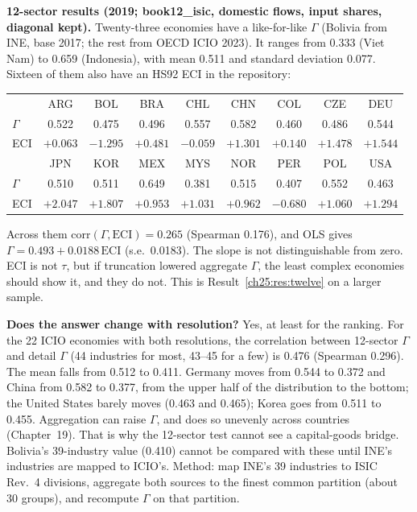 \documentclass[../solutions_manual.tex]{subfiles}
\begin{document}
 \textbf{12-sector results (2019; book12\_isic, domestic flows, input shares, diagonal kept).} Twenty-three economies have a like-for-like $\Gamma$ (Bolivia from INE, base 2017; the rest from OECD ICIO 2023). It ranges from 0.333 (Viet Nam) to 0.659 (Indonesia), with mean 0.511 and standard deviation 0.077. Sixteen of them also have an HS92 ECI in the repository:
\begin{center}
\small
\begin{tabular}{lcccccccc}
\toprule
& ARG & BOL & BRA & CHL & CHN & COL & CZE & DEU \\
$\Gamma$ & 0.522 & 0.475 & 0.496 & 0.557 & 0.582 & 0.460 & 0.486 & 0.544 \\
ECI & $+0.063$ & $-1.295$ & $+0.481$ & $-0.059$ & $+1.301$ & $+0.140$ & $+1.478$ & $+1.544$ \\
\midrule
& JPN & KOR & MEX & MYS & NOR & PER & POL & USA \\
$\Gamma$ & 0.510 & 0.511 & 0.649 & 0.381 & 0.515 & 0.407 & 0.552 & 0.463 \\
ECI & $+2.047$ & $+1.807$ & $+0.953$ & $+1.031$ & $+0.962$ & $-0.680$ & $+1.060$ & $+1.294$ \\
\bottomrule
\end{tabular}
\end{center}
Across them $\text{corr}(\Gamma, \text{ECI}) = 0.265$ (Spearman 0.176), and OLS gives $\Gamma = 0.493 + 0.0188\,\text{ECI}$ (s.e.\ 0.0183). The slope is not distinguishable from zero. ECI is not $\tau$, but if truncation lowered aggregate $\Gamma$, the least complex economies should show it, and they do not. This is Result~\ref{ch25:res:twelve} on a larger sample.

 \textbf{Does the answer change with resolution?} Yes, at least for the ranking. For the 22 ICIO economies with both resolutions, the correlation between 12-sector $\Gamma$ and detail $\Gamma$ (44 industries for most, 43--45 for a few) is 0.476 (Spearman 0.296). The mean falls from 0.512 to 0.411. Germany moves from 0.544 to 0.372 and China from 0.582 to 0.377, from the upper half of the distribution to the bottom; the United States barely moves (0.463 and 0.465); Korea goes from 0.511 to 0.455. Aggregation can raise $\Gamma$, and does so unevenly across countries (Chapter~19). That is why the 12-sector test cannot see a capital-goods bridge. Bolivia's 39-industry value (0.410) cannot be compared with these until INE's industries are mapped to ICIO's. Method: map INE's 39 industries to ISIC Rev.~4 divisions, aggregate both sources to the finest common partition (about 30 groups), and recompute $\Gamma$ on that partition.
\end{document}
